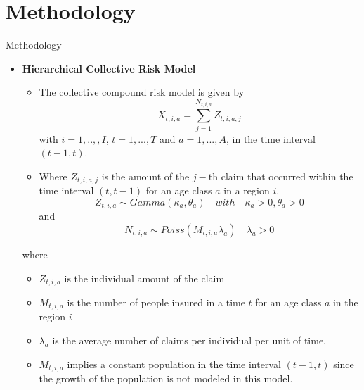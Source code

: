 \documentclass[10pt]{beamer} %
\begin{document}
\section{Methodology}
\begin{frame}{Methodology}
\begin{itemize}
\item \textbf{Hierarchical Collective Risk Model}\\
\begin{itemize}
    \item The collective compound risk model is given by $$X_{t,i,a}=\sum_{j=1}^{N_{t,i,a}}Z_{t,i,a,j}$$ with $i=1,..,,I$, $t=1,...,T$ and $a=1,...,A$, in the time interval $(t-1,t)$.
    \item Where $Z_{t,i,a,j}$ is the amount of the $j-$th claim that occurred within the time interval $(t,t-1)$ for an age class $a$ in a region $i$.\\
        \begin{equation}\label{gamma1}
        Z_{t,i,a}\sim Gamma(\kappa_a,\theta_a)\quad with\quad \kappa_a>0,\theta_a>0
    \end{equation}
    and 
    \begin{equation}
    \label{poisson1}
    N_{t,i,a}\sim Poiss(M_{t,i,a}\lambda_a)\quad \lambda_a>0
    \end{equation} 
\end{itemize}
       
where 
\begin{itemize}
    \item $Z_{t,i,a}$ is the individual amount of the claim
    \item $M_{t,i,a}$ is the number of people insured in a time $t$ for an age class $a$ in the region $i$
    \item $\lambda_a$ is the average number of claims per individual per unit of time.
    \item $M_{t,i,a}$ implies a constant population in the time interval $(t-1,t)$ since the growth of the population is not modeled in this model.
\end{itemize}
    \end{itemize}
\end{frame}
\end{document}
